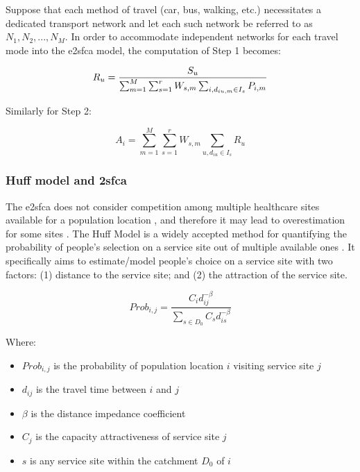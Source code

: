 Suppose that each method of travel (car, bus, walking, etc.) necessitates a dedicated transport network and let each such network be referred to as $N_1, N_2, ..., N_M$. In order to accommodate independent networks for each travel mode into the \ac{e2sfca} model, the computation of Step 1 becomes:

\begin{equation}
    R_u =  \frac{S_u}{\sum_{m=1}^{M} \sum_{s=1}^{r} W_{s,m} \sum_{i, d_{iu,m} \in I_s} P_{i,m}} \\
\end{equation}

Similarly for Step 2:

\begin{equation}
    A_i = \sum_{m=1}^{M} \sum_{s=1}^{r} W_{s, m} \sum_{u, d_{iu} \in I_s} R_u
\end{equation}

\subsubsection*{Huff model and \acl{2sfca}}

The \ac{e2sfca} does not consider competition among multiple healthcare sites available for a population location \cite{wan_three-step_2012}, and therefore it may lead to overestimation for some sites \cite{luo_integrating_2014}. The Huff Model is a widely accepted method for quantifying the probability of people's selection on a service site out of multiple available ones \cite{huff_probabilistic_1963}. It specifically aims to estimate/model people's choice on a service site with two factors: (1) distance to the service site; and (2) the attraction of the service site.

\begin{equation}
    Prob_{i,j} = \frac{C_i d_{ij}^{-\beta}}{\sum_{s \in D_0} C_s d_{is}^{-\beta}}
\end{equation}

Where:

\begin{itemize}
    \item $Prob_{i,j}$ is the probability of population location $i$ visiting service site $j$
    \item $d_{ij}$ is the travel time between $i$ and $j$
    \item $\beta$ is the distance impedance coefficient
    \item $C_j$ is the capacity \/ attractiveness of service site $j$
    \item $s$ is any service site within the catchment $D_0$ of $i$
\end{itemize}

